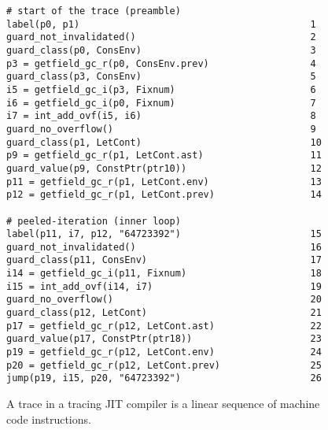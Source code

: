 \begin{figure}[!htbp]                    %
  \centering
  \begin{minipage}{0.5\textwidth}
    \begin{lstlisting}[style=rptrace-style]
# start of the trace (preamble)
label(p0, p1)                                         1
guard_not_invalidated()                               2
guard_class(p0, ConsEnv)                              3
p3 = getfield_gc_r(p0, ConsEnv.prev)                  4
guard_class(p3, ConsEnv)                              5
i5 = getfield_gc_i(p3, Fixnum)                        6
i6 = getfield_gc_i(p0, Fixnum)                        7
i7 = int_add_ovf(i5, i6)                              8
guard_no_overflow()                                   9
guard_class(p1, LetCont)                              10
p9 = getfield_gc_r(p1, LetCont.ast)                   11
guard_value(p9, ConstPtr(ptr10))                      12
p11 = getfield_gc_r(p1, LetCont.env)                  13
p12 = getfield_gc_r(p1, LetCont.prev)                 14

# peeled-iteration (inner loop)
label(p11, i7, p12, "64723392")                       15
guard_not_invalidated()                               16
guard_class(p11, ConsEnv)                             17
i14 = getfield_gc_i(p11, Fixnum)                      18
i15 = int_add_ovf(i14, i7)                            19
guard_no_overflow()                                   20
guard_class(p12, LetCont)                             21
p17 = getfield_gc_r(p12, LetCont.ast)                 22
guard_value(p17, ConstPtr(ptr18))                     23
p19 = getfield_gc_r(p12, LetCont.env)                 24
p20 = getfield_gc_r(p12, LetCont.prev)                25
jump(p19, i15, p20, "64723392")                       26
\end{lstlisting}
  \end{minipage}
  \caption{A trace in a tracing JIT compiler is a linear sequence of machine code instructions.}
  \label{fig:trace}
\end{figure}
